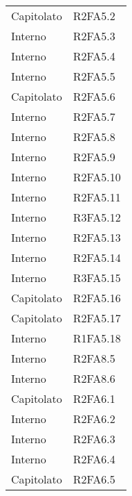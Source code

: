{\begin{longtable}{ C{4cm} C{4cm}}
Capitolato & R2FA5.2\\


Interno & R2FA5.3\\

Interno & R2FA5.4\\

Interno & R2FA5.5\\

Capitolato & R2FA5.6\\

Interno & R2FA5.7\\

Interno & R2FA5.8\\

Interno & R2FA5.9\\

Interno & R2FA5.10\\

Interno & R2FA5.11\\


Interno & R3FA5.12\\

Interno & R2FA5.13\\

Interno & R2FA5.14\\

Interno & R3FA5.15\\

Capitolato & R2FA5.16\\

Capitolato & R2FA5.17\\

Interno & R1FA5.18\\

Interno & R2FA8.5\\

Interno & R2FA8.6\\

Capitolato & R2FA6.1\\


Interno & R2FA6.2\\

Interno & R2FA6.3\\

Interno & R2FA6.4\\

Capitolato & R2FA6.5\\


\end{longtable}}

